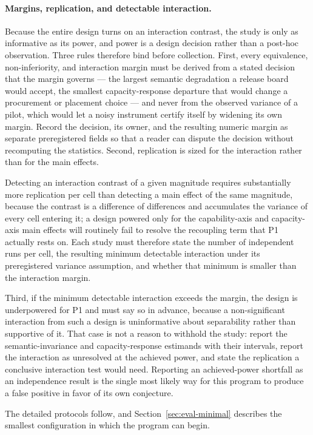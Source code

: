 \paragraph{Margins, replication, and detectable interaction.}
Because the entire design turns on an interaction contrast, the study is only as informative as its power, and power is a design decision rather than a post-hoc observation. Three rules therefore bind before collection. First, every equivalence, non-inferiority, and interaction margin must be derived from a stated decision that the margin governs --- the largest semantic degradation a release board would accept, the smallest capacity-response departure that would change a procurement or placement choice --- and never from the observed variance of a pilot, which would let a noisy instrument certify itself by widening its own margin. Record the decision, its owner, and the resulting numeric margin as separate preregistered fields so that a reader can dispute the decision without recomputing the statistics. Second, replication is sized for the interaction rather than for the main effects.

Detecting an interaction contrast of a given magnitude requires substantially more replication per cell than detecting a main effect of the same magnitude, because the contrast is a difference of differences and accumulates the variance of every cell entering it; a design powered only for the capability-axis and capacity-axis main effects will routinely fail to resolve the recoupling term that P1 actually rests on. Each study must therefore state the number of independent runs per cell, the resulting minimum detectable interaction under its preregistered variance assumption, and whether that minimum is smaller than the interaction margin.

Third, if the minimum detectable interaction exceeds the margin, the design is underpowered for P1 and must say so in advance, because a non-significant interaction from such a design is uninformative about separability rather than supportive of it. That case is not a reason to withhold the study: report the semantic-invariance and capacity-response estimands with their intervals, report the interaction as unresolved at the achieved power, and state the replication a conclusive interaction test would need. Reporting an achieved-power shortfall as an independence result is the single most likely way for this program to produce a false positive in favor of its own conjecture.

The detailed protocols follow, and Section~\ref{sec:eval-minimal} describes the smallest configuration in which the program can begin.

